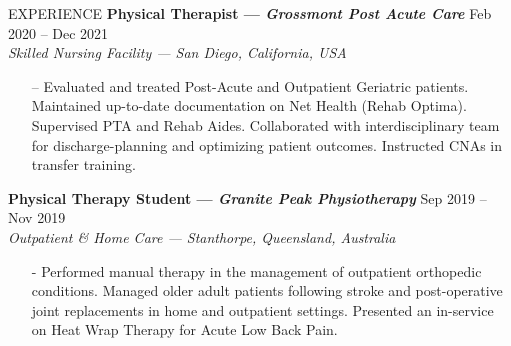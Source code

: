 \documentclass{resume} %
\begin{document}
\begin{rSection}{EXPERIENCE}
\textbf{Physical Therapist --- \textit{Grossmont Post Acute Care}} \hfill Feb 2020 -- Dec 2021\\
\textit{Skilled Nursing Facility --- San Diego, California, USA}
\vspace*{-0.2cm}\begin{itemize}
    \item[--] Evaluated and treated Post-Acute and Outpatient Geriatric patients. Maintained up-to-date documentation on Net Health (Rehab Optima). Supervised PTA and Rehab Aides. Collaborated with interdisciplinary team for discharge-planning and optimizing patient outcomes. Instructed CNAs in transfer training.
\end{itemize}

\textbf{Physical Therapy Student --- \textit{Granite Peak Physiotherapy}} 
\hfill Sep 2019 -- Nov 2019\\
\textit{Outpatient \& Home Care --- Stanthorpe, Queensland, Australia}
\vspace*{-0.2cm}\begin{itemize}
    \item[-] Performed manual therapy in the management of outpatient orthopedic conditions. Managed older adult patients following stroke and post-operative joint replacements in home and outpatient settings. Presented an in-service on Heat Wrap Therapy for Acute Low Back Pain.
\end{itemize}


\end{rSection}
\end{document}
